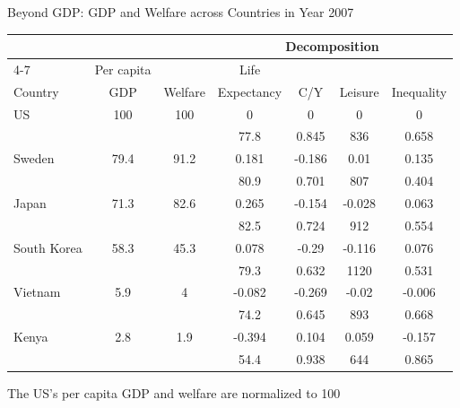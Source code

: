 \documentclass[aspectratio=1610]{beamer}
\begin{document}
\begin{frame}[wide]{Beyond GDP: GDP and Welfare across Countries in Year 2007}
	\begin{table}[htbp]
		\centering
		\begin{tabular}{lcccccc}
			&       &       & \multicolumn{4}{c}{Decomposition} \\
			\cmidrule{4-7}          & Per capita &       & Life  &       &       &  \\
			Country & GDP   & Welfare & Expectancy & C/Y   & Leisure & Inequality \\
			\midrule
			US    & 100   & 100   & 0     & 0     & 0     & 0 \\
			&       &       & 77.8  & 0.845 & 836   & 0.658 \\
			Sweden & 79.4  & 91.2  & 0.181 & -0.186 & 0.01  & 0.135 \\
			&       &       & 80.9  & 0.701 & 807   & 0.404 \\
			Japan & 71.3  & 82.6  & 0.265 & -0.154 & -0.028 & 0.063 \\
			&       &       & 82.5  & 0.724 & 912   & 0.554 \\
			South Korea & 58.3  & 45.3  & 0.078 & -0.29 & -0.116 & 0.076 \\
			&       &       & 79.3  & 0.632 & 1120  & 0.531 \\
			Vietnam & 5.9   & 4     & -0.082 & -0.269 & -0.02 & -0.006 \\
			&       &       & 74.2  & 0.645 & 893   & 0.668 \\
			Kenya & 2.8   & 1.9   & -0.394 & 0.104 & 0.059 & -0.157 \\
			&       &       & 54.4  & 0.938 & 644   & 0.865 \\
			\bottomrule
		\end{tabular}%
	\end{table}%
	The US's per capita GDP and welfare are normalized to 100
\end{frame}
\end{document}
